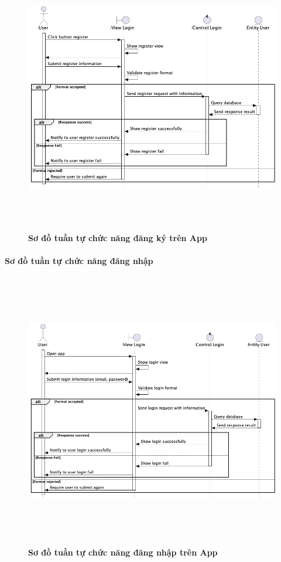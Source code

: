    \begin{figure}[H]
         \centering
         \includegraphics[width=16cm,height=12cm]{Images/mobile_app/register.png}
         \caption[Sơ đồ tuần tự chức năng đăng ký trên App]{\bfseries \fontsize{12pt}{0pt}
         \selectfont Sơ đồ tuần tự chức năng đăng ký trên App}
         \label{hinh21} %
    \end{figure}

\paragraph{Sơ đồ tuần tự chức năng đăng nhập}
\mbox{}

    \begin{figure}[H]
         \centering
         \includegraphics[width=16cm,height=12cm]{Images/mobile_app/login.png}
         \caption[Sơ đồ tuần tự chức năng đăng nhập trên App]{\bfseries \fontsize{12pt}{0pt}
         \selectfont Sơ đồ tuần tự chức năng đăng nhập trên App}
         \label{hinh21} %
    \end{figure}

